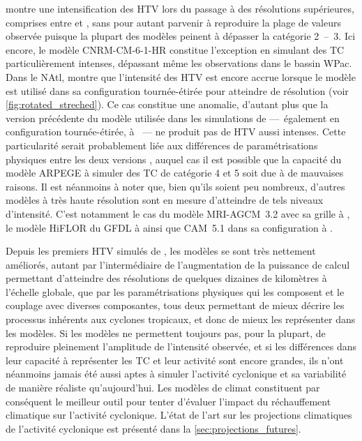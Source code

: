\documentclass[../main.tex]{subfiles}
\begin{document}
\cite{roberts_impact_2020} montre une intensification des HTV lors du passage à des résolutions supérieures, comprises entre  et , sans pour
autant parvenir à reproduire la plage de valeurs observée puisque la plupart des modèles peinent à dépasser la catégorie \num{2}~--~\num{3}. Ici encore, le
modèle CNRM-CM-6-1-HR constitue l'exception en simulant des TC particulièrement intenses, dépassant même les observations dans le bassin WPac. Dans le NAtl,
\cite{chauvin_future_2020} montre que l'intensité des HTV est encore accrue lorsque le modèle est utilisé dans sa configuration tournée-étirée pour atteindre
 de résolution (voir \cref{fig:rotated_streched}). Ce cas constitue une anomalie, d'autant plus que la version précédente du modèle utilisée dans les
simulations de \cite{daloz_impact_2012} ---~également en configuration tournée-étirée, à ~--- ne produit pas de HTV aussi intenses. Cette particularité
serait probablement liée aux différences de paramétrisations physiques entre les deux versions \parencite{chauvin_future_2020}, auquel cas il est possible que la
capacité du modèle ARPEGE à simuler des TC de catégorie \num{4} et \num{5} soit due à de mauvaises raisons. Il est néanmoins à noter que, bien qu'ils soient peu
nombreux, d'autres modèles à très haute résolution sont en mesure d'atteindre de tels niveaux d'intensité. C'est notamment le cas du modèle MRI-AGCM~3.2 avec
sa grille à  \parencite{murakami_future_2012}, le modèle HiFLOR du GFDL à  \parencite{murakami_simulation_2015} ainsi que CAM~5.1 dans sa
configuration à  \parencite{wehner_effect_2014}.

Depuis les premiers HTV simulés de \cite{manabe_tropical_1970}, les modèles se sont très nettement améliorés, autant par l'intermédiaire de l'augmentation de la
puissance de calcul permettant d'atteindre des résolutions de quelques dizaines de kilomètres à l'échelle globale, que par les paramétrisations physiques qui
les composent et le couplage avec diverses composantes, tous deux permettant de mieux décrire les processus inhérents aux cyclones tropicaux, et donc de mieux
les représenter dans les modèles. Si les modèles ne permettent toujours pas, pour la plupart, de reproduire pleinement l'amplitude de l'intensité observée, et
si les différences dans leur capacité à représenter les TC et leur activité sont encore grandes, ils n'ont néanmoins jamais été aussi aptes à
simuler l'activité cyclonique et sa variabilité de manière réaliste qu'aujourd'hui. Les modèles de climat constituent par conséquent le meilleur outil pour
tenter d'évaluer l'impact du réchauffement climatique sur l'activité cyclonique. L'état de l'art sur les projections climatiques de l'activité cyclonique est présenté 
dans la \cref{sec:projections_futures}.
\end{document}
